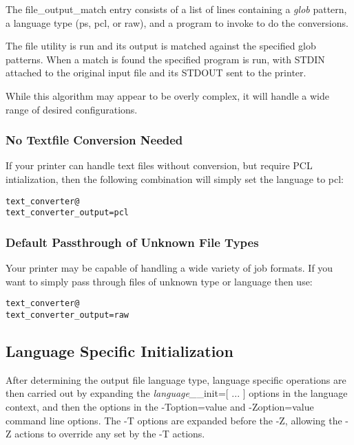 \documentclass[a4paper]{article}
\begin{document}
The
{\ttfamily file\_output\_match}
entry consists of a list of lines containing
a {\itshape glob\/} pattern,
a language type ({\ttfamily ps}, {\ttfamily pcl}, or {\ttfamily raw}),
and a program to invoke to do the conversions.

The
{\ttfamily file}
utility is run and its output is matched against the specified
glob patterns.
When a match is found the specified program is run,
with STDIN attached to the original input file and its
STDOUT sent to the printer.

While this algorithm may appear to be overly complex, it
will handle a wide range of desired configurations.


\subsubsection{No Textfile Conversion Needed}

If your printer can handle text files without conversion,
but require PCL intialization, then the following combination
will simply set the language to
{\ttfamily pcl}:
\begin{tscreen}
\begin{verbatim}
text_converter@
text_converter_output=pcl
\end{verbatim}
\end{tscreen}



\subsubsection{Default Passthrough of Unknown File Types}

Your printer may be capable of handling a wide variety of job
formats.  If you want to simply pass through files of
unknown type or language then use:
\begin{tscreen}
\begin{verbatim}
text_converter@
text_converter_output=raw
\end{verbatim}
\end{tscreen}



\subsection{Language Specific Initialization
\label{languageinit}}

After determining the output file language type,
language specific operations are then carried out by
expanding the
{\itshape language\_\/}{\ttfamily \_init=[ ... ]}
options in the language context,
and then the options in the
{\ttfamily -Toption=value}
and
{\ttfamily -Zoption=value}
command line options.
The 
{\ttfamily -T}
options are expanded before the
{\ttfamily -Z},
allowing the 
{\ttfamily -Z} actions to override any set by the
{\ttfamily -T} actions.
\end{document}
